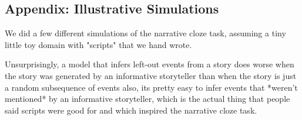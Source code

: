 \documentclass[10pt,a4paper]{article}
\newcommand{\todo}[1]{{\color{red}#1}}
\begin{document}


\setlength{\bibleftmargin}{.125in}
\setlength{\bibindent}{-\bibleftmargin}



\subsection{Appendix: Illustrative Simulations}

\todo{
We did a few different simulations of the narrative cloze task, assuming a tiny little toy domain with "scripts" that we hand wrote.

Unsurprisingly,
a model that infers left-out events from a story does worse when the story was generated by an informative storyteller than when the story is just a random subsequence of events
also, its pretty easy to infer events that *weren't mentioned* by an informative storyteller, which is the actual thing that people said scripts were good for and which inspired the narrative cloze task.
}
\end{document}
